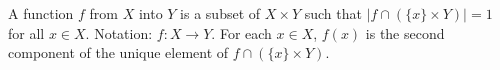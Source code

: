 A function $f$ from $X$ into $Y$ is a subset of $X \times Y$ such that $|f \cap (\{x\} \times Y)| = 1$ for all $x \in X$. Notation: $f: X \rightarrow Y$. For each $x \in X$, $f(x)$ is the second component of the unique element of $f \cap (\{x\} \times Y)$.
